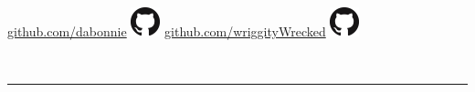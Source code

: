 \documentclass[11pt, twoside, a4paper]{article}
\begin{document}
{\begin{minipage}[t]{0.33\textwidth}
\begin{flushright}
                \linebreak
                \href{https://github.com/dabonnie}{github.com/dabonnie} \space\space \includegraphics[scale=0.225]{GitHub-Mark-32px}\hspace{1px}
                \linebreak
                \href{https://github.com/wriggityWrecked}{github.com/wriggityWrecked} \space\space \includegraphics[scale=0.225]{GitHub-Mark-32px}\hspace{1px}
                \linebreak
            \end{flushright}
        \end{minipage}
        \\
        \textcolor{lightGray}{\rule{575px}{0.4pt}}
        \setlength{\columnsep}{20px}
        \begin{multicols}{2}

\end{multicols}}
\end{document}
